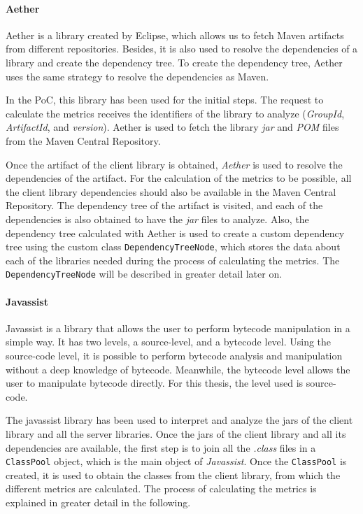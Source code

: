 \paragraph{Aether}
Aether is a library created by Eclipse, which allows us to fetch Maven artifacts from different repositories. Besides, it is also used to resolve the dependencies of a library and create the dependency tree. To create the dependency tree, Aether uses the same strategy to resolve the dependencies as Maven.

In the PoC, this library has been used for the initial steps. The request to calculate the metrics receives the identifiers of the library to analyze (\textit{GroupId}, \textit{ArtifactId}, and \textit{version}). Aether is used to fetch the library \textit{jar} and \textit{POM} files from the Maven Central Repository.

Once the artifact of the client library is obtained, \textit{Aether} is used to resolve the dependencies of the artifact. For the calculation of the metrics to be possible, all the client library dependencies should also be available in the Maven Central Repository. The dependency tree of the artifact is visited, and each of the dependencies is also obtained to have the \textit{jar} files to analyze. Also, the dependency tree calculated with Aether is used to create a custom dependency tree using the custom class \texttt{DependencyTreeNode}, which stores the data about each of the libraries needed during the process of calculating the metrics. The \texttt{DependencyTreeNode} will be described in greater detail later on.

\paragraph{Javassist}
Javassist is a library that allows the user to perform bytecode manipulation in a simple way. It has two levels, a source-level, and a bytecode level. Using the source-code level, it is possible to perform bytecode analysis and manipulation without a deep knowledge of bytecode. Meanwhile, the bytecode level allows the user to manipulate bytecode directly.
For this thesis, the level used is source-code.

The javassist library has been used to interpret and analyze the jars of the client library and all the server libraries. Once the jars of the client library and all its dependencies are available, the first step is to join all the \textit{.class} files in a \texttt{ClassPool} object, which is the main object of \textit{Javassist}. Once the \texttt{ClassPool} is created, it is used to obtain the classes from the client library, from which the different metrics are calculated. The process of calculating the metrics is explained in greater detail in the following.

